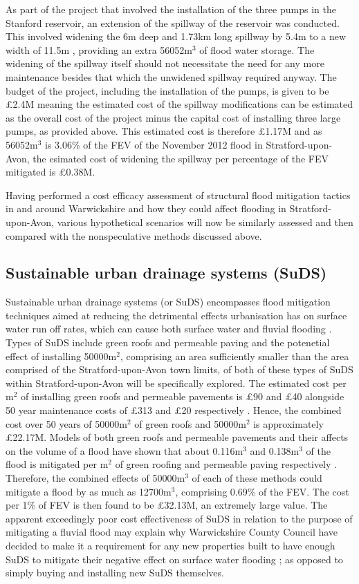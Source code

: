 \documentclass[11pt,a4paper]{article}
\begin{document}
As part of the project that involved the installation of the three pumps in the Stanford reservoir, an extension of the spillway of the reservoir was conducted. This involved widening the 6m deep and 1.73km long spillway by 5.4m to a new width of 11.5m \cite{spillway}, providing an extra 56052m$^3$ of flood water storage. The widening of the spillway itself should not necessitate the need for any more maintenance besides that which the unwidened spillway required anyway. The budget of the project, including the installation of the pumps, is given to be \pounds2.4M \cite{spillway} meaning the estimated cost of the spillway modifications can be estimated as the overall cost of the project minus the capital cost of installing three large pumps, as provided above. This estimated cost is therefore \pounds1.17M and as 56052m$^3$ is 3.06\% of the FEV of the November 2012 flood in Stratford-upon-Avon, the esimated cost of widening the spillway per percentage of the FEV mitigated is \pounds0.38M.

Having performed a cost efficacy assessment of structural flood mitigation tactics in and around Warwickshire and how they could affect flooding in Stratford-upon-Avon, various hypothetical scenarios will now be similarly assessed and then compared with the nonspeculative methods discussed above.

\subsection{Sustainable urban drainage systems (SuDS)}
Sustainable urban drainage systems (or SuDS) encompasses flood mitigation techniques aimed at reducing the detrimental effects urbanisation has on surface water run off rates, which can cause both surface water and fluvial flooding \cite{suds}. Types of SuDS include green roofs and permeable paving and the potenetial effect of installing 50000m$^2$, comprising an area sufficiently smaller than the area comprised of the Stratford-upon-Avon town limits, of both of these types of SuDS within Stratford-upon-Avon will be specifically explored. The estimated cost per m$^2$ of installing green roofs and permeable pavements is \pounds90 and \pounds40 alongside 50 year maintenance costs of \pounds313 and \pounds20 respectively \cite{cost3}. Hence, the combined cost over 50 years of 50000m$^2$ of green roofs and 50000m$^2$ is approximately \pounds22.17M. Models of both green roofs and permeable pavements and their affects on the volume of a flood have shown that about 0.116m$^3$ and 0.138m$^3$ of the flood is mitigated per m$^2$ of green roofing and permeable paving respectively \cite{suds}. Therefore, the combined effects of 50000m$^3$ of each of these methods could mitigate a flood by as much as 12700m$^3$, comprising 0.69\% of the FEV. The cost per 1\% of FEV is then found to be \pounds32.13M, an extremely large value. The apparent exceedingly poor cost effectiveness of SuDS in relation to the purpose of mitigating a fluvial flood may explain why Warwickshire County Council have decided to make it a requirement for any new properties built to have enough SuDS to mitigate their negative effect on surface water flooding \cite{war2}{;} as opposed to simply buying and installing new SuDS themselves.
\end{document}
